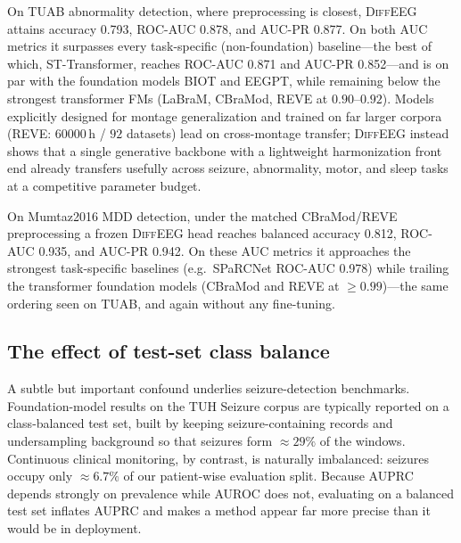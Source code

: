 \documentclass[journal]{IEEEtran}
\begin{document}
On TUAB abnormality detection, where preprocessing is closest, \textsc{DiffEEG}
attains accuracy \num{0.793}, ROC-AUC \num{0.878}, and AUC-PR \num{0.877}. On
both AUC metrics it surpasses every task-specific (non-foundation)
baseline---the best of which, ST-Transformer, reaches ROC-AUC \num{0.871} and
AUC-PR \num{0.852}---and is on par with the foundation models BIOT and EEGPT,
while remaining below the strongest transformer FMs (LaBraM, CBraMod, REVE at
$0.90$--$0.92$). Models explicitly
designed for montage generalization and trained on far larger corpora
(REVE: \num{60000}\,h / $92$ datasets) lead on cross-montage transfer;
\textsc{DiffEEG} instead shows that a single generative backbone with a
lightweight harmonization front end already transfers usefully across seizure,
abnormality, motor, and sleep tasks at a competitive parameter budget.

On Mumtaz2016 MDD detection, under the matched CBraMod/REVE preprocessing a
frozen \textsc{DiffEEG} head reaches balanced accuracy \num{0.812}, ROC-AUC
\num{0.935}, and AUC-PR \num{0.942}. On these AUC metrics it approaches the strongest
task-specific baselines (e.g.\ SPaRCNet ROC-AUC \num{0.978}) while trailing the
transformer foundation models (CBraMod and REVE at $\ge\!0.99$)---the same
ordering seen on TUAB, and again without any fine-tuning.

\subsection{The effect of test-set class balance}
A subtle but important confound underlies seizure-detection benchmarks.
Foundation-model results on the TUH Seizure corpus are typically reported on a
class-balanced test set, built by keeping seizure-containing records and
undersampling background so that seizures form $\approx\!29\%$ of the windows.
Continuous clinical monitoring, by contrast, is naturally imbalanced: seizures
occupy only $\approx\!6.7\%$ of our patient-wise evaluation split. Because AUPRC
depends strongly on prevalence while AUROC does not, evaluating on a balanced
test set inflates AUPRC and makes a method appear far more precise than it would
be in deployment.
\end{document}
